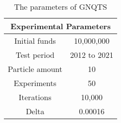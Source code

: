 \documentclass[../Experiment Result.tex]{subfiles}
\begin{document}
\begin{table}[H]
    \centering
    \caption{The parameters of GNQTS}
    \label{para}
    \footnotesize
    \begin{tabular}{cc}
        \toprule
        \multicolumn{2}{c}{\textbf{Experimental Parameters}} \\
        \midrule
        Initial funds   & 10,000,000                         \\
        Test period     & 2012 to 2021                       \\
        Particle amount & 10                                 \\
        Experiments     & 50                                 \\
        Iterations      & 10,000                             \\
        Delta           & 0.00016                            \\
        \bottomrule
    \end{tabular}
\end{table}
\end{document}
